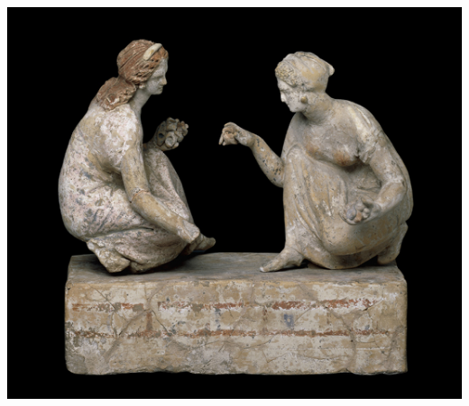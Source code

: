 \documentclass{beamer}
\begin{document}
\begin{frame}
\begin{columns}{}
\begin{column}{0.5\textwidth}
\begin{block}{}
                \includegraphics[width=0.8\hsize]{art/playing_knuckle_bones.jpg}
            \end{block}
        \end{column}
    \end{columns}
\end{frame}

\end{document}
